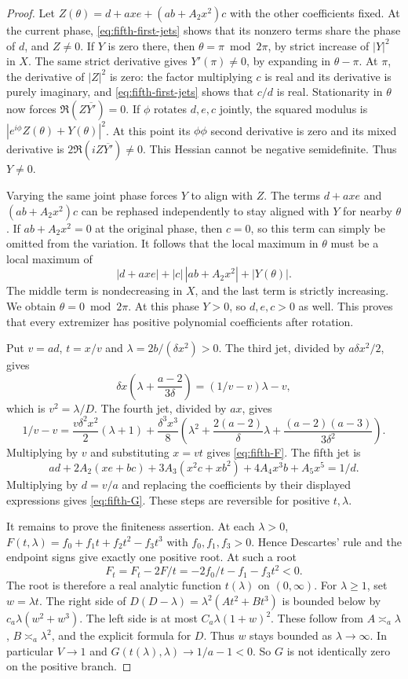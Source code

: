 \documentclass[11pt]{article}
\begin{document}
\begin{proof}
Let \(Z(\theta)=d+axe+(ab+A_2x^2)c\) with the other coefficients
fixed. At the current phase, \eqref{eq:fifth-first-jets} shows
that its nonzero terms share the phase of \(d\), and \(Z\ne0\).
If \(Y\) is zero there, then \(\theta=\pi\bmod 2\pi\),
by strict increase of \(|Y|^2\) in \(X\). The same strict
derivative gives \(Y'(\pi)\ne0\), by expanding in \(\theta-\pi\).
At \(\pi\), the derivative of \(|Z|^2\) is zero:
the factor multiplying \(c\) is real and its derivative is
purely imaginary, and \eqref{eq:fifth-first-jets} shows that
\(c/d\) is real. Stationarity in \(\theta\) now forces
\(\Re(Z\overline{Y'})=0\).
If \(\phi\) rotates \(d,e,c\) jointly, the squared modulus
is \(|e^{i\phi}Z(\theta)+Y(\theta)|^2\).
At this point its \(\phi\phi\) second derivative is zero and
its mixed derivative is \(2\Re(iZ\overline{Y'})\ne0\).
This Hessian cannot be negative semidefinite. Thus \(Y\ne0\).

Varying the same joint phase forces \(Y\) to align with \(Z\).
The terms \(d+axe\) and \((ab+A_2x^2)c\) can be rephased
independently to stay aligned with \(Y\) for nearby \(\theta\).
If \(ab+A_2x^2=0\) at the original phase, then \(c=0\), so
this term can simply be omitted from the variation.
It follows that the local maximum in \(\theta\) must be a local
maximum of
\[
 |d+axe|+|c|\,|ab+A_2x^2|+|Y(\theta)|.
\]
The middle term is nondecreasing in \(X\), and the last term
is strictly increasing. We obtain \(\theta=0\bmod 2\pi\).
At this phase \(Y>0\), so \(d,e,c>0\) as well.
This proves that every extremizer has positive polynomial
coefficients after rotation.

Put \(v=ad\), \(t=x/v\) and \(\lambda=2b/(\delta x^2)>0\).
The third jet, divided by \(a\delta x^2/2\), gives
\[
 \delta x\left(\lambda+\frac{a-2}{3\delta}\right)
   = (1/v-v)\lambda-v ,
\]
which is \(v^2=\lambda/D\).
The fourth jet, divided by \(ax\), gives
\[
 1/v-v
 =\frac{v\delta^2x^2}{2}(\lambda+1)
    +\frac{\delta^3x^3}{8}
          \left(\lambda^2+\frac{2(a-2)}{\delta}\lambda+
                     \frac{(a-2)(a-3)}{3\delta^2}\right).
\]
Multiplying by \(v\) and substituting \(x=vt\) gives
\eqref{eq:fifth-F}. The fifth jet is
\[
 a d+2A_2(xe+bc)+3A_3(x^2c+xb^2)+4A_4 x^3b+A_5x^5=1/d.
\]
Multiplying by \(d=v/a\) and replacing the coefficients by their
displayed expressions gives \eqref{eq:fifth-G}. These steps are
reversible for positive \(t,\lambda\).

It remains to prove the finiteness assertion. At each \(\lambda>0\),
\(F(t,\lambda)=f_0+f_1t+f_2t^2-f_3t^3\) with
\(f_0,f_1,f_3>0\). Hence Descartes' rule and the endpoint signs
give exactly one positive root. At such a root
\[
 F_t=F_t-2F/t=-2f_0/t-f_1-f_3t^2<0.
\]
The root is therefore a real analytic function \(t(\lambda)\)
on \((0,\infty)\).
For \(\lambda\geq1\), set \(w=\lambda t\).
The right side of \(D(D-\lambda)=\lambda^2(At^2+Bt^3)\)
is bounded below by \(c_a\lambda(w^2+w^3)\).
The left side is at most \(C_a\lambda(1+w)^2\).
These follow from \(A\asymp_a\lambda\),
\(B\asymp_a\lambda^2\), and the explicit formula for \(D\).
Thus \(w\) stays bounded as \(\lambda\to\infty\).
In particular \(V\to1\) and
\(G(t(\lambda),\lambda)\to 1/a-1<0\).
So \(G\) is not identically zero on the positive branch.


\end{proof}
\end{document}
